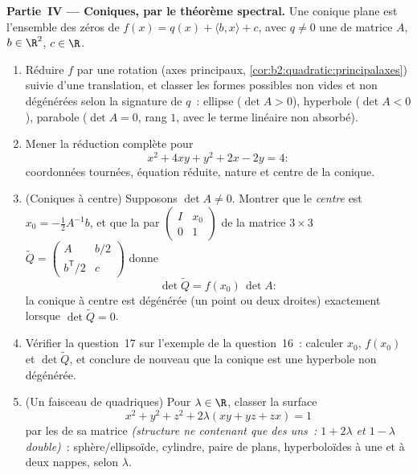 \begin{problem}
\medskip
\noindent\textbf{Partie~IV --- Coniques, par le théorème spectral.}
Une conique plane est l'ensemble des zéros de $f(x) = q(x) + \langle
b, x\rangle + c$, avec $q \neq 0$ une  de matrice
$A$, $b \in \R^2$, $c \in \R$.
\begin{enumerate}[resume]
  \item Réduire $f$ par une rotation (axes principaux,
        \cref{cor:b2:quadratic:principalaxes}) suivie d'une
        translation, et classer les formes possibles non vides et
        non dégénérées selon la signature de $q$~: ellipse
        ($\det A > 0$), hyperbole ($\det A < 0$), parabole
        ($\det A = 0$, rang $1$, avec le terme linéaire non
        absorbé).
  \item Mener la réduction complète pour
        \[
        x^2 + 4xy + y^2 + 2x - 2y = 4 :
        \]
        coordonnées tournées, équation réduite, nature et
        centre de la conique.
  \item (Coniques à centre) Supposons $\det A \neq 0$. Montrer que
        le \emph{centre} est $x_0 = -\frac12 A^{-1}b$, et que la
         par $\begin{pmatrix} I & x_0\\ 0 &
        1\end{pmatrix}$ de la matrice $3\times3$ $\widetilde Q
        = \begin{pmatrix} A & b/2 \\ b^{\mathsf T}/2 &
        c\end{pmatrix}$ donne
        \[
        \det\widetilde Q = f(x_0)\,\det A :
        \]
        la conique à centre est dégénérée (un point ou deux droites)
        exactement lorsque $\det\widetilde Q = 0$.
  \item Vérifier la question~17 sur l'exemple de la question~16~:
        calculer $x_0$, $f(x_0)$ et $\det\widetilde Q$, et
        conclure de nouveau que la conique est une hyperbole non
        dégénérée.
  \item (Un faisceau de quadriques) Pour $\lambda \in \R$, classer
        la surface
        \[
        x^2 + y^2 + z^2 + 2\lambda(xy + yz + zx) = 1
        \]
        par les  de sa matrice \emph{(structure ne
        contenant que des uns~:  $1 + 2\lambda$ et
        $1 - \lambda$ double)}~: sphère/ellipsoïde, cylindre, paire
        de plans, hyperboloïdes à une et à deux nappes, selon
        $\lambda$.
\end{enumerate}


\end{problem}
